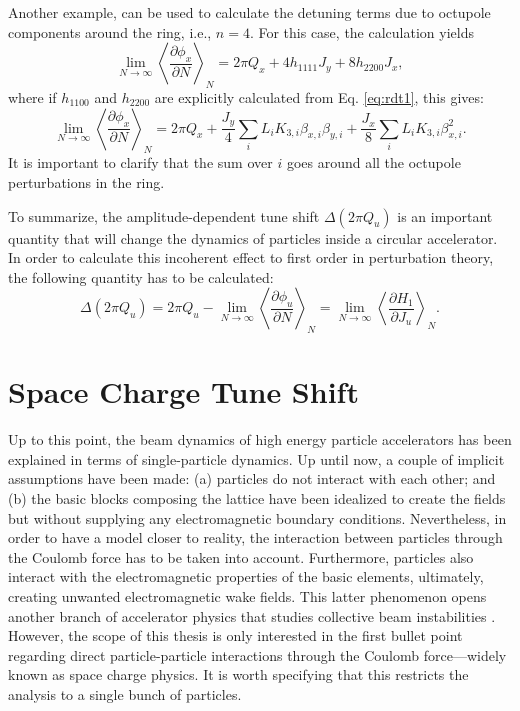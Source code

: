 Another example, can be used to calculate the detuning terms due to octupole components around the ring, i.e., $n=4$. For this case, the calculation yields
\begin{equation}
    \label{eq:octu}
    \lim_{N\to\infty} \left\langle \frac{\partial \phi_x}{\partial N}\right\rangle _N = 2\pi Q_x + 4h_{1111}J_y + 8 h_{2200} J_x,
\end{equation}
where if $h_{1100}$ and $h_{2200}$ are explicitly calculated from Eq. \ref{eq:rdt1}, this gives:
\begin{equation}
    \label{eq:octu2}
    \lim_{N\to\infty} \left\langle \frac{\partial \phi_x}{\partial N}\right\rangle _N = 2\pi Q_x + \frac{J_y}{4}\sum_i L_i K_{3,i} \beta_{x,i} \beta_{y,i} + \frac{J_x}{8}\sum_i L_i K_{3,i} \beta_{x,i}^2.
\end{equation}
It is important to clarify that the sum over $i$ goes around all the octupole perturbations in the ring.

To summarize, the amplitude-dependent tune shift $\Delta\left( 2 \pi Q_u \right)$ is an important quantity that will change the dynamics of particles inside a circular accelerator. In order to calculate this incoherent effect to first order in perturbation theory, the following quantity has to be calculated:
\begin{equation}
    \label{eq:adtsfinal}
    \Delta\left( 2 \pi Q_u \right) = 2\pi Q_u - \lim_{N\to\infty} \left\langle \frac{\partial \phi_u}{\partial N}\right\rangle _N = \lim_{N\to\infty} \left\langle \frac{\partial H_1}{\partial J_u} \right\rangle _N. 
\end{equation}  

\section{\label{sec:sc1}Space Charge Tune Shift}

Up to this point, the beam dynamics of high energy particle accelerators has been explained in terms of single-particle dynamics. Up until now, a couple of implicit assumptions have been made: (a) particles do not interact with each other; and (b) the basic blocks composing the lattice have been idealized to create the fields but without supplying any electromagnetic boundary conditions. Nevertheless, in order to have a model closer to reality, the interaction between particles through the Coulomb force has to be taken into account. Furthermore, particles also interact with the electromagnetic properties of the basic elements, ultimately, creating unwanted electromagnetic wake fields. This latter phenomenon opens another branch of accelerator physics that studies collective beam instabilities \cite{chao}. However, the scope of this thesis is only interested in the first bullet point regarding direct particle-particle interactions through the Coulomb force---widely known as space charge physics. It is worth specifying that this restricts the analysis to a single bunch of particles. 

